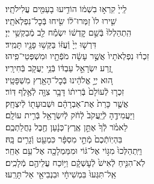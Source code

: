 \documentclass[twoside, openany, parskip=half, 11pt]{book}
\begin{document}
\begin{narrow}
לַֽייָ֙ קִרְא֣וּ בִשְׁמ֔וֹ \hfill
הוֹדִ֥יעוּ בָעַמִּ֖ים עֲלִילֹתָֽיו׃\\
שִׁ֤ירוּ לוֹ֙ זַמְּרוּ־ל֔וֹ \hfill שִׂ֖יחוּ בְּֿכׇל־נִפְלְאֹתָֽיו׃\\
הִֽתְהַלְלוּ֙ בְּֿשֵׁ֣ם קׇדְשׁ֔וֹ \hfill יִשְׂמַ֕ח לֵ֖ב מְֿבַקְשֵׁ֥י יְיָ׃\\
דִּרְשׁ֤וּ יְיָ֙ וְֿעֻזּ֔וֹ \hfill בַּקְּשׁ֥וּ פָנָ֖יו תָּמִֽיד׃\\
זִכְר֗וּ נִפְלְאֹתָיו֙ אֲשֶׁ֣ר עָשָׂ֔ה \hfill מֹפְֿתָ֖יו וּמִשְׁפְּטֵי־פִֽיהוּ׃\\
זֶ֚רַע יִשְׂרָאֵ֣ל עַבְדּ֔וֹ \hfill בְּֿנֵ֥י יַעֲקֹ֖ב בְּֿחִירָֽיו׃\\
ה֚וּא יְיָ֣ אֱלֹהֵ֔ינוּ \hfill בְּֿכׇל־הָאָ֖רֶץ מִשְׁפָּטָֽיו׃\\
זִכְר֤וּ לְֿעוֹלָם֙ בְּֿרִית֔וֹ \hfill דָּבָ֥ר צִוָּ֖ה לְֿאֶ֥לֶף דּֽוֹר׃\\
אֲשֶׁ֤ר כָּרַת֙ אֶת־אַבְרָהָ֔ם \hfill וּשְׁבוּעָת֖וֹ לְֿיִצְחָֽק׃\\
וַיַּעֲמִידֶ֤הָ לְֿיַֽעֲקֹב֙ לְֿחֹ֔ק \hfill לְֿיִשְׂרָאֵ֖ל בְּֿרִ֥ית עוֹלָֽם׃\\
לֵאמֹ֗ר לְֿךָ֙ אֶתֵּ֣ן אֶֽרֶץ־כְּנָ֔עַן \hfill חֶ֖בֶל נַחֲלַתְכֶֽם׃\\
בִּהְיֽוֹתְֿכֶם֙ מְֿתֵ֣י מִסְפָּ֔ר \hfill כִּמְעַ֖ט וְֿגָרִ֥ים בָּֽהּ׃\\
וַיִּֽתְהַלְּכוּ֙ מִגּ֣וֹי אֶל־גּ֔וֹי \hfill וּמִמַּמְלָכָ֖ה אֶל־עַ֥ם אַחֵֽר׃\\
לֹֽא־הִנִּ֤יחַ לְֿאִישׁ֙ לְֿעׇשְׁקָ֔ם \hfill וַיּ֥וֹכַח עֲלֵיהֶ֖ם מְֿלָכִֽים׃\\
אַֽל־תִּגְּעוּ֙ בִּמְשִׁיחָ֔י \hfill וּבִנְבִיאַ֖י אַל־תָּרֵֽעוּ׃\\


\end{narrow}
\end{document}

